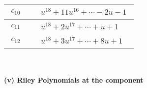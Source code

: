 \documentclass[1p]{elsarticle_modified}
\theoremstyle{definition}
\begin{document}
\begin{tabular}{m{50pt}|m{274pt}}
\hline $$\begin{aligned}c_{10}\end{aligned}$$&$\begin{aligned}
&u^{18}+11 u^{16}+\cdots-2 u-1
\end{aligned}$\\
\hline $$\begin{aligned}c_{11}\end{aligned}$$&$\begin{aligned}
&u^{18}+2 u^{17}+\cdots+u+1
\end{aligned}$\\
\hline $$\begin{aligned}c_{12}\end{aligned}$$&$\begin{aligned}
&u^{18}+3 u^{17}+\cdots+8 u+1
\end{aligned}$\\
\hline
\end{tabular}\\~\\
\newpage\renewcommand{\arraystretch}{1}
\flushleft \textbf{(v) Riley Polynomials at the component}\newline \\
\end{document}
